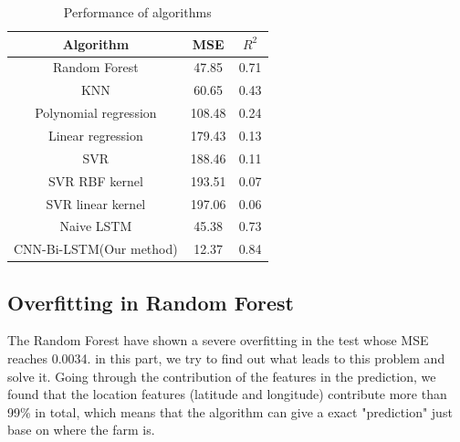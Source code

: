 \documentclass[conference, a4paper]{IEEEtran}
\begin{document}
  \begin{table}[htbp]
    \caption{Performance of algorithms}
    \begin{center}
    \begin{tabular}{|c|c|c|}
    \hline
    Algorithm                                    & MSE      & $R^2$\\
    \hline
    Random Forest \cite{liawClassificationRegressionRandomForest2002}                      &    47.85  & 0.71\\
    KNN \cite{petersonKnearestNeighbor2009}                                         & 60.65 & 0.43\\
    Polynomial regression & 108.48 & 0.24\\
    Linear regression   & 179.43 & 0.13\\
    SVR \cite{druckerSupportVectorRegression1997}                                     & 188.46 & 0.11\\
    SVR RBF kernel \cite{cristianiniIntroductionSupportVector2000}                     & 193.51 & 0.07\\
    SVR linear kernel                      & 197.06 & 0.06\\
    \hline
    Naive LSTM    & 45.38    &  0.73\\
    CNN-Bi-LSTM(Our method) & 12.37 & 0.84\\
    \hline
    \end{tabular}
    \label{tab:result}
    \end{center}
  \end{table}


\subsection{Overfitting in Random Forest} \label{sec:ovf}
  The Random Forest have shown a severe overfitting in the test whose MSE reaches 0.0034. in this part, we try to find out what leads to this problem and solve it. Going through the contribution of the features in the prediction, we found that the location features (latitude and longitude) contribute more than 99\% in total, which means that the algorithm can give a exact "prediction" just base on where the farm is.
\end{document}
